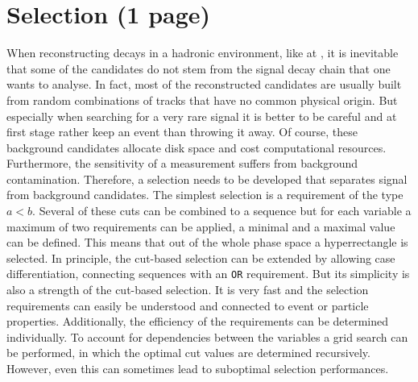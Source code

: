 
\section{Selection (1 page)}
\label{sec:dataanalysis:selection}

When reconstructing decays in a hadronic environment, like at \lhcb, it is
inevitable that some of the candidates do not stem from the signal decay chain
that one wants to analyse. In fact, most of the reconstructed candidates are
usually built from random combinations of tracks that have no common physical
origin. But especially when searching for a very rare signal it is better to
be careful and at first stage rather keep an event than throwing it away. Of
course, these background candidates allocate disk space and cost computational
resources. Furthermore, the sensitivity of a measurement suffers from
background contamination. Therefore, a selection needs to be developed that
separates signal from background candidates. The simplest selection is a
requirement of the type $a < b$. Several of these cuts can be combined to a
sequence but for each variable a maximum of two requirements can be applied,
\ie a minimal and a maximal value can be defined. This means that out of the
whole phase space a hyperrectangle is selected. In principle, the cut-based
selection can be extended by allowing case differentiation, \ie connecting
sequences with an \texttt{OR} requirement. But its simplicity is also a
strength of the cut-based selection. It is very fast and the selection
requirements can easily be understood and connected to event or particle
properties. Additionally, the efficiency of the requirements can be determined
individually. To account for dependencies between the variables a grid search
can be performed, in which the optimal cut values are determined recursively.
However, even this can sometimes lead to suboptimal selection performances.